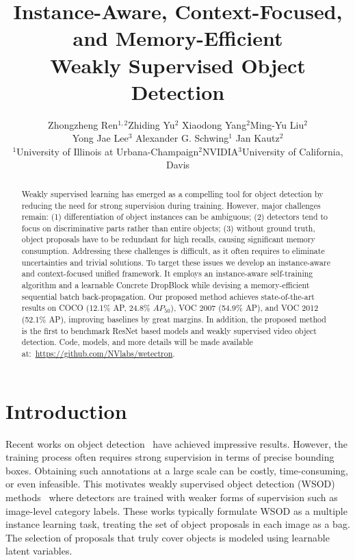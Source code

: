 \documentclass[10pt,twocolumn,letterpaper]{article}
\begin{document}
\title{Instance-Aware, Context-Focused, and Memory-Efficient\\
Weakly Supervised Object Detection}

\author{
Zhongzheng Ren$^{1,2}$\footnotemark[1]
\quad Zhiding Yu$^{2}$
\quad Xiaodong Yang$^{2}$\footnotemark[1]
\quad Ming-Yu Liu$^{2}$\\
\quad Yong Jae Lee$^{3}$
\quad Alexander G.  Schwing$^{1}$
\quad Jan Kautz$^{2}$\\
$^{1}$University of Illinois at Urbana-Champaign\quad $^{2}$NVIDIA\quad $^{3}$University of California, Davis
}

\maketitle


\begin{abstract}
\vspace{-0.1in}
Weakly supervised learning has emerged as a compelling tool for object detection by reducing the need for strong supervision during training. However, major challenges remain: (1) differentiation of object instances can be ambiguous; (2) detectors tend to focus on discriminative parts rather than entire objects; (3) without ground truth, object proposals have to be redundant for high recalls, causing significant memory consumption. Addressing these challenges is difficult, as it often requires to eliminate uncertainties and trivial solutions. To target these issues we develop an instance-aware and context-focused unified framework. It employs an instance-aware self-training algorithm and a learnable Concrete DropBlock while devising a memory-efficient sequential batch back-propagation. Our proposed method achieves state-of-the-art results on COCO (12.1\% AP, 24.8\% $AP_{50}$), VOC 2007 (54.9\% AP),  and VOC 2012 (52.1\% AP), improving baselines by great margins. In addition, the proposed method is the first to benchmark ResNet based models and weakly supervised video object detection. 
Code, models, and more details will be made available at:~\url{https://github.com/NVlabs/wetectron}.
\end{abstract}
\vspace{-1em}

\section{Introduction}
\label{sec:intro}
Recent works on object detection~\cite{he2017maskrcnn, ren16faster, yolo, cornernet} have achieved impressive results. However, the training process often requires strong supervision in terms of precise bounding boxes. Obtaining such annotations at a large scale can be costly, time-consuming, or even infeasible. This motivates weakly supervised object detection (WSOD) methods~\cite{Bilen16, tang2017multiple, KantorovOCL16} where detectors are trained with weaker forms of supervision such as image-level category labels. These works typically formulate WSOD as a multiple instance learning task, treating the set of object proposals in each image as a bag. The selection of proposals that truly cover objects is modeled using learnable latent variables. 
\end{document}
